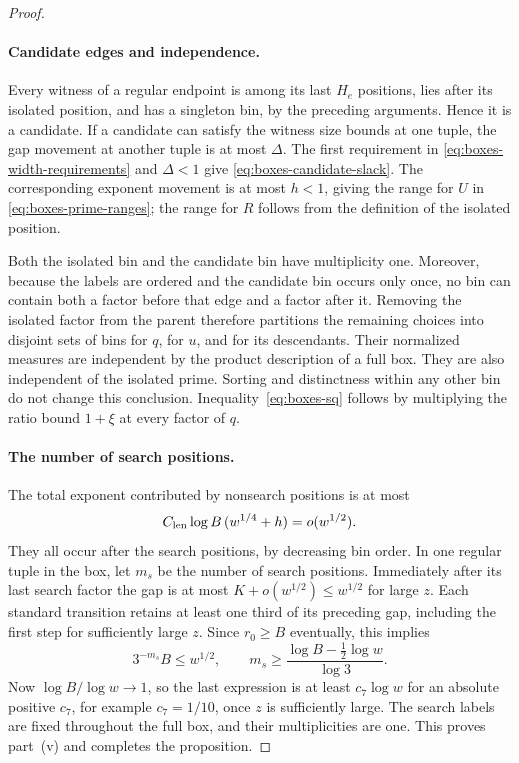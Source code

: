\begin{proof}
\paragraph{Candidate edges and independence.}
Every witness of a regular endpoint is among its last $H_e$
positions, lies after its isolated position, and has a singleton
bin, by the preceding arguments.  Hence it is a candidate.
If a candidate can satisfy the witness size bounds at one tuple,
the gap movement at another tuple is at most $\Delta$.  The first
requirement in \eqref{eq:boxes-width-requirements} and $\Delta<1$
give \eqref{eq:boxes-candidate-slack}.  The corresponding exponent
movement is at most $h<1$, giving the range for $U$ in
\eqref{eq:boxes-prime-ranges}; the range for $R$ follows from the
definition of the isolated position.

Both the isolated bin and the candidate bin have multiplicity
one.  Moreover, because the labels are ordered and the candidate
bin occurs only once, no bin can contain both a factor before
that edge and a factor after it.  Removing the isolated factor
from the parent therefore partitions the remaining choices into
disjoint sets of bins for $q$, for $u$, and for its descendants.
Their normalized measures are independent by the product
description of a full box.  They are also independent of the
isolated prime.  Sorting and distinctness within any other bin
do not change this conclusion.  Inequality~\eqref{eq:boxes-sq}
follows by multiplying the ratio bound $1+\xi$ at every factor
of $q$.

\paragraph{The number of search positions.}
The total exponent contributed by nonsearch positions is at most
\begin{equation}\label{eq:boxes-nonsearch-sum}
 C_{\rm len}\log B\,(w^{1/4}+h)=o(w^{1/2}).
\end{equation}
They all occur after the search positions, by decreasing bin
order.  In one regular tuple in the box, let $m_s$ be the number
of search positions.  Immediately after its last search factor
the gap is at most $K+o(w^{1/2})\le w^{1/2}$ for large $z$.
Each standard transition retains at least one third of its
preceding gap, including the first step for sufficiently large
$z$.  Since $r_0\ge B$ eventually, this implies
\[
 3^{-m_s}B\le w^{1/2},\qquad
 m_s\ge\frac{\log B-\tfrac12\log w}{\log3}.
\]
Now $\log B/\log w\to1$, so the last expression is at least
$c_7\log w$ for an absolute positive $c_7$, for example
$c_7=1/10$, once $z$ is sufficiently large.  The search labels
are fixed throughout the full box, and their multiplicities
are one.  This proves part~(v) and completes the proposition.
\end{proof}

